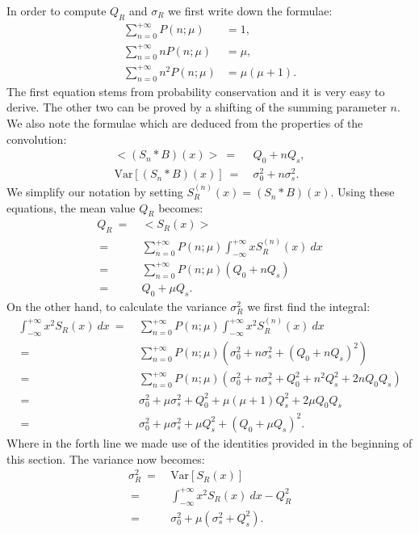 \documentclass[a4paper,11pt]{article}
\begin{document}
In order to compute $Q_R$ and $\sigma_R$ we first write down the formulae:
\begin{align}
\sum_{n=0}^{+\infty} P( n; \mu ) & = 1, \\
\sum_{n=0}^{+\infty} n P( n; \mu ) & = \mu, \\
\sum_{n=0}^{+\infty} n^2 P( n; \mu ) & = \mu ( \mu + 1 ). 
\end{align} 
The first equation stems from probability conservation and it is very easy to derive.
The other two can be proved by a shifting of the summing parameter $n$. 
We also note the formulae which are deduced from the properties of the convolution:
\begin{align}
< ( S_n * B )(x) > \ = \ & Q_0 + n Q_s, \\
\text{Var}[ ( S_n * B )(x) ] \ = \ & \sigma_0^2 + n\sigma_s^2. 
\end{align} 
We simplify our notation by setting $S_R^{(n)}(x)=( S_n * B )(x)$. 
Using these equations, the mean value $Q_R$ becomes:
\begin{align}
Q_R \ = \ & < S_R (x) >  \nonumber \\
 \ = \ & \sum_{n=0}^{+\infty} P( n; \mu ) \int_{-\infty}^{+\infty} x S_R^{(n)}(x) \ dx \nonumber \\
  \ = \ & \sum_{n=0}^{+\infty} P( n; \mu ) ( Q_0 + n Q_s ) \nonumber \\
  \ = \ & Q_0 + \mu Q_s.   
\end{align} 
On the other hand, to calculate the variance $\sigma_R^2$ we first find the integral:
\begin{align}
\int_{-\infty}^{+\infty} x^2 S_R(x) \ dx \ = & \  \sum_{n=0}^{+\infty} P( n; \mu )   \int_{-\infty}^{+\infty} x^2 S_R^{(n)}(x) \ dx \nonumber \\
\ = & \ \sum_{n=0}^{+\infty} P( n; \mu ) ( \sigma_0^2 + n\sigma_s^2 + ( Q_0 +n Q_s )^2 ) \nonumber \\
\ = & \ \sum_{n=0}^{+\infty} P( n; \mu ) ( \sigma_0^2 + n\sigma_s^2 + Q_0^2  + n^2 Q_s^2  + 2 n Q_0 Q_s ) \nonumber \\
\ = & \ \sigma_0^2 + \mu\sigma_s^2 + Q_0^2 + \mu ( \mu + 1 ) Q_s^2 + 2 \mu Q_0 Q_s \nonumber \\
\ = & \ \sigma_0^2 + \mu\sigma_s^2 + \mu Q_s^2 + ( Q_0 + \mu Q_s )^2. 
\end{align}
Where in the forth line we made use of the identities provided in the beginning of this section. 
The variance now becomes:
\begin{align}
\sigma_R^2 \ = \ & \text{Var}[ S_R(x)] \nonumber \\
\ = \ & \int_{-\infty}^{+\infty} x^2 S_R(x) \ dx - Q_R^2 \nonumber \\
\ = \ & \sigma_0^2 + \mu( \sigma_s^2 + Q_s^2 ).
\end{align}
\end{document}
